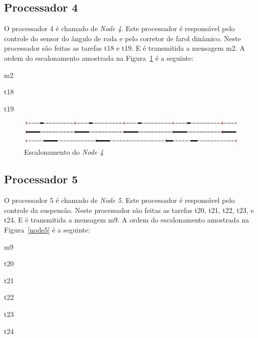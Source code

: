 \documentclass[12pt]{article}
\begin{document}
\subsection{Processador 4}

O processador 4 é chamado de \textit{Node 4}. Este processador é responsável pelo controle do sensor do ângulo de roda e pelo corretor de farol dinâmico. Neste processador são feitas as tarefas t18 e t19. E é transmitida a mensagem m2. 
A ordem do escalonamento amostrada na Figura~\ref{node4} é a seguinte:

\begin{enumerate}
    \begin{horizlist}{3}{1cm}
    \item m2
    \item t18
    \item t19
    \end{horizlist}
\end{enumerate}

\begin{figure}[ht]
	\centering
	\includegraphics[width=1\textwidth]{node4.jpg}
    \caption{Escalonamento do \textit{Node 4}}
	\label{node4}
\end{figure}

\subsection{Processador 5}

O processador 5 é chamado de \textit{Node 5}. Este processador é responsável pelo controle da suspensão. Neste processador são feitas as tarefas t20, t21, t22, t23, e t24. E é transmitida a mensagem m9. 
A ordem do escalonamento amostrada na Figura~\ref{node5} é a seguinte:

\begin{enumerate}
    \begin{horizlist}{3}{1cm}
    \item m9
    \item t20
    \item t21
    \item t22
    \item t23
    \item t24
    \end{horizlist}
\end{enumerate}
\end{document}
